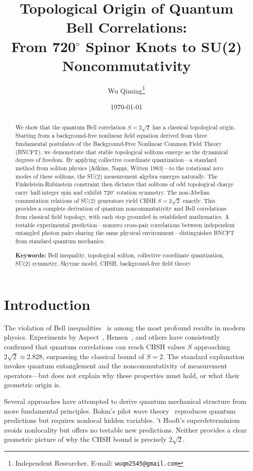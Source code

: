 \documentclass[11pt,a4paper]{article}
\title{\textbf{Topological Origin of Quantum Bell Correlations:\\[0.3em] From 720$^\circ$ Spinor Knots to SU(2) Noncommutativity}}
\author{Wu Qiming\thanks{Independent Researcher. E-mail: \texttt{wuqm2545@gmail.com}}}
\date{\today}
\begin{document}
\maketitle

\begin{abstract}
\noindent We show that the quantum Bell correlation $S = 2\sqrt{2}$ has a classical topological origin. Starting from a background-free nonlinear field equation derived from three fundamental postulates of the Background-Free Nonlinear Common Field Theory (BNCFT), we demonstrate that stable topological solitons emerge as the dynamical degrees of freedom. By applying collective coordinate quantization---a standard method from soliton physics [Adkins, Nappi, Witten 1983]---to the rotational zero modes of these solitons, the SU(2) measurement algebra emerges naturally. The Finkelstein-Rubinstein constraint then dictates that solitons of odd topological charge carry half-integer spin and exhibit $720^\circ$ rotation symmetry. The non-Abelian commutation relations of SU(2) generators yield CHSH $S = 2\sqrt{2}$ exactly. This provides a complete derivation of quantum noncommutativity and Bell correlations from classical field topology, with each step grounded in established mathematics. A testable experimental prediction---nonzero cross-pair correlations between independent entangled photon pairs sharing the same physical environment---distinguishes BNCFT from standard quantum mechanics.

\bigskip
\noindent\textbf{Keywords:} Bell inequality, topological soliton, collective coordinate quantization, SU(2) symmetry, Skyrme model, CHSH, background-free field theory
\end{abstract}

\section{Introduction}

The violation of Bell inequalities~\cite{bell1964} is among the most profound results in modern physics. Experiments by Aspect~\cite{aspect1982}, Hensen~\cite{hensen2015}, and others have consistently confirmed that quantum correlations can reach CHSH values $S$ approaching $2\sqrt{2} \approx 2.828$, surpassing the classical bound of $S = 2$. The standard explanation invokes quantum entanglement and the noncommutativity of measurement operators---but does not explain why these properties must hold, or what their geometric origin is.

Several approaches have attempted to derive quantum mechanical structure from more fundamental principles. Bohm's pilot wave theory~\cite{bohm1952} reproduces quantum predictions but requires nonlocal hidden variables. 't Hooft's superdeterminism~\cite{thooft2016} avoids nonlocality but offers no testable new predictions. Neither provides a clear geometric picture of why the CHSH bound is precisely $2\sqrt{2}$.
\end{document}
